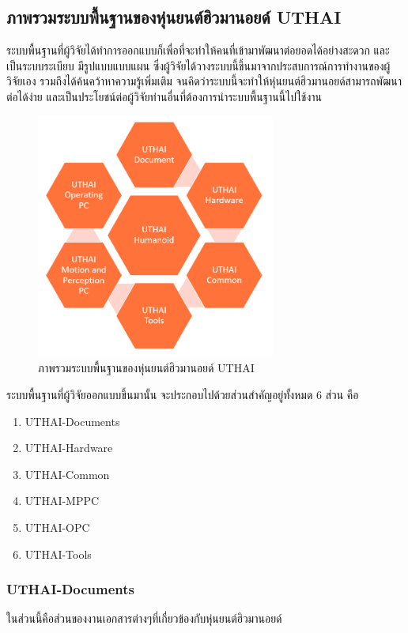 \clearpage
\subsection{ภาพรวมระบบพื้นฐานของหุ่นยนต์ฮิวมานอยด์ UTHAI}
ระบบพื้นฐานที่ผู้วิจัยได้ทำการออกแบบก็เพื่อที่จะทำให้คนที่เข้ามาพัฒนาต่อยอดได้อย่างสะดวก และเป็นระบบระเบียบ
มีรูปแบบแบบแผน ซึ่งผู้วิจัยได้วางระบบนี้ขึ้นมาจากประสบการณ์การทำงานของผู้วิจัยเอง รวมถึงได้ค้นคว้าหาความรู้เพิ่มเติม
จนคิดว่าระบบนี้จะทำให้หุ่นยนต์ฮิวมานอยด์สามารถพัฒนาต่อได้ง่าย และเป็นประโยชน์ต่อผู้วิจัยท่านอื่นที่ต้องการนำระบบพื้นฐานนี้ไปใช้งาน

\begin{figure}[!ht]
	\centering
	\includegraphics[width=0.7\textwidth]{chapter4/images/uthai_platform.png}
	\caption{ภาพรวมระบบพื้นฐานของหุ่นยนต์ฮิวมานอยด์ UTHAI}
	\label{fig:uthai_platform}
\end{figure}

ระบบพื้นฐานที่ผู้วิจัยออกแบบขึ้นมานั้น จะประกอบไปด้วยส่วนสำคัญอยู่ทั้งหมด 6 ส่วน คือ
\vspace{-10pt}
\begin{enumerate}[label=\arabic*., leftmargin=2.5cm]
    \setlength\itemsep{-0.25em}
    \item UTHAI-Documents
    \item UTHAI-Hardware
    \item UTHAI-Common
    \item UTHAI-MPPC
    \item UTHAI-OPC
    \item UTHAI-Tools
\end{enumerate}

\clearpage
\subsubsection*{UTHAI-Documents}
ในส่วนนี้คือส่วนของงานเอกสารต่างๆที่เกี่ยวข้องกับหุ่นยนต์ฮิวมานอยด์

